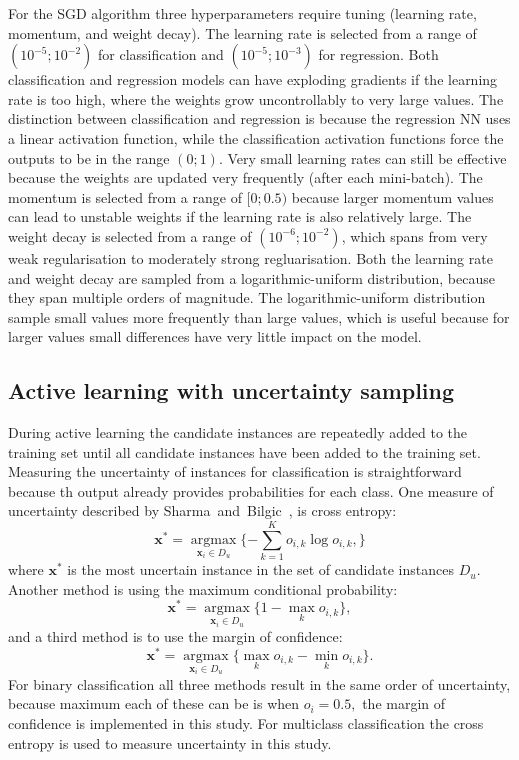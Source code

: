 \documentclass[conference]{IEEEtran}
\begin{document}
	For the SGD algorithm three hyperparameters require tuning (learning rate, momentum, and weight decay). The learning rate is selected from a range of $(10^{-5}; 10^{-2})$ for classification and $(10^{-5}; 10^{-3})$ for regression. Both classification and regression models can have exploding gradients if the learning rate is too high, where the weights grow uncontrollably to very large values. The distinction between classification and regression is because the regression NN uses a linear activation function, while the classification activation functions force the outputs to be in the range $(0; 1)$. Very small learning rates can still be effective because the weights are updated very frequently (after each mini-batch). The momentum is selected from a range of $[0; 0.5)$ because larger momentum values can lead to unstable weights if the learning rate is also relatively large. The weight decay is selected from a range of $(10^{-6}; 10^{-2})$, which spans from very weak regularisation to moderately strong regluarisation. Both the learning rate and weight decay are sampled from a logarithmic-uniform distribution, because they span multiple orders of magnitude. The logarithmic-uniform distribution sample small values more frequently than large values, which is useful because for larger values small differences have very little impact on the model.
	
	\subsection{Active learning with uncertainty sampling}
	During active learning the candidate instances are repeatedly added to the training set until all candidate instances have been added to the training set. Measuring the uncertainty of instances for classification is straightforward because th output already provides probabilities for each class. One measure of uncertainty described by Sharma~and~Bilgic~\cite{alus}, is cross entropy:
	\[\boldsymbol{x}^* = \operatorname*{argmax}_{\boldsymbol{x}_i \in D_u} \{-\sum_{k = 1}^{K} o_{i, k} \log o_{i, k},\}\]
	where $\boldsymbol{x}^*$ is the most uncertain instance in the set of candidate instances $D_u$. Another method is using the maximum conditional probability:
	\[\boldsymbol{x}^* = \operatorname*{argmax}_{\boldsymbol{x}_i \in D_u} \{ 1 - \max_{k} o_{i, k}\},\]
	and a third method is to use the margin of confidence:
	\[\boldsymbol{x}^* = \operatorname*{argmax}_{\boldsymbol{x}_i \in D_u} \{ \max_{k} o_{i, k} - \min_k o_{i, k}\}.\] For binary classification all three methods result in the same order of uncertainty, because maximum each of these can be is when $o_i = 0.5,$ the margin of confidence is implemented in this study. For multiclass classification the cross entropy is used to measure uncertainty in this study. 
	
\end{document}
